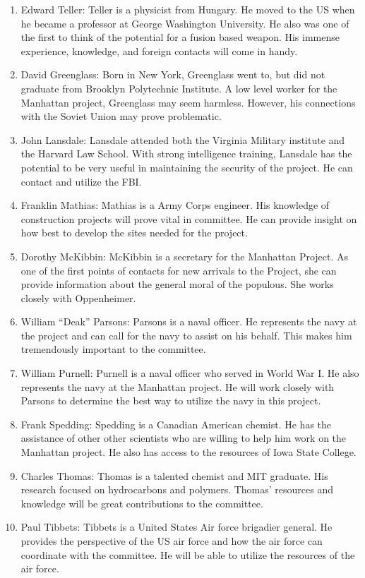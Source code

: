 \documentclass[11 pt, twoside]{article}
\begin{document}
\begin{enumerate}
\item Edward Teller: Teller is a physicist from Hungary. He moved to the US when he became a professor at George Washington University. He also was one of the first to think of the potential for a fusion based weapon. His immense experience, knowledge, and foreign contacts will come in handy.
\item David Greenglass: Born in New York, Greenglass went to, but did not graduate from Brooklyn  Polytechnic Institute. A low level worker for the Manhattan project, Greenglass may seem harmless. However, his connections with the Soviet Union may prove problematic. 
\item John Lansdale: Lansdale attended both the Virginia Military institute and the Harvard Law School. With strong intelligence training, Lansdale has the potential to be very useful in maintaining the security of the project. He can contact and utilize the FBI.
\item Franklin Mathias: Mathias is a Army Corps engineer. His knowledge of construction projects will prove vital in committee. He can provide insight on how best to develop the sites needed for the project.
\item Dorothy McKibbin: McKibbin is a secretary for the Manhattan Project. As one of the first points of contacts for new arrivals to the Project, she can provide information about the general moral of the populous. She works closely with Oppenheimer.
\item William ``Deak'' Parsons: Parsons is a naval officer. He represents the navy at the project and can call for the navy to assist on his behalf. This makes him tremendously important to the committee.
\item William Purnell: Purnell is a naval officer who served in World War I. He also represents the navy at the Manhattan project. He will work closely with Parsons to determine the best way to utilize the navy in this project.
\item Frank Spedding: Spedding is a Canadian American chemist. He has the assistance of other other scientists who are willing to help him work on the Manhattan project. He also has access to the resources of Iowa State College.
\item Charles Thomas: Thomas is a talented chemist and MIT graduate. His research focused on hydrocarbons and polymers. Thomas’ resources and knowledge will be great contributions to the committee. 
\item Paul Tibbets: Tibbets is a United States Air force brigadier general. He provides the perspective of the US air force and how the air force can coordinate with the committee. He will be able to utilize the resources of the air force.

\end{enumerate}
\end{document}
